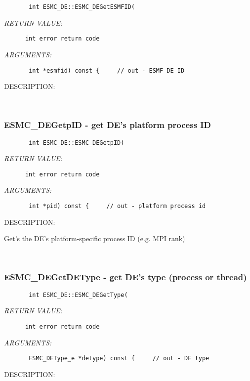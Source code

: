   
\begin{verbatim}       int ESMC_DE::ESMC_DEGetESMFID(\end{verbatim}{\em RETURN VALUE:}
\begin{verbatim}      int error return code\end{verbatim}{\em ARGUMENTS:}
\begin{verbatim}       int *esmfid) const {     // out - ESMF DE ID\end{verbatim}
{\sf DESCRIPTION:\\ }


   
 
\mbox{}\hrulefill\ 
 
\subsubsection{ESMC\_DEGetpID - get DE's platform process ID}


 
  
\begin{verbatim}       int ESMC_DE::ESMC_DEGetpID(\end{verbatim}{\em RETURN VALUE:}
\begin{verbatim}      int error return code\end{verbatim}{\em ARGUMENTS:}
\begin{verbatim}       int *pid) const {     // out - platform process id\end{verbatim}
{\sf DESCRIPTION:\\ }


       Get's the DE's platform-specific process ID (e.g. MPI rank)
   
 
\mbox{}\hrulefill\ 
 
\subsubsection{ESMC\_DEGetDEType - get DE's type (process or thread)}


 
  
\begin{verbatim}       int ESMC_DE::ESMC_DEGetType(\end{verbatim}{\em RETURN VALUE:}
\begin{verbatim}      int error return code\end{verbatim}{\em ARGUMENTS:}
\begin{verbatim}       ESMC_DEType_e *detype) const {     // out - DE type\end{verbatim}
{\sf DESCRIPTION:\\ }


